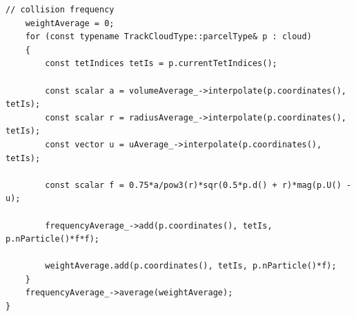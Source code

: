 \begin{lstlisting}[caption = average]
    // collision frequency
    weightAverage = 0;
    for (const typename TrackCloudType::parcelType& p : cloud)
    {
        const tetIndices tetIs = p.currentTetIndices();

        const scalar a = volumeAverage_->interpolate(p.coordinates(), tetIs);
        const scalar r = radiusAverage_->interpolate(p.coordinates(), tetIs);
        const vector u = uAverage_->interpolate(p.coordinates(), tetIs);

        const scalar f = 0.75*a/pow3(r)*sqr(0.5*p.d() + r)*mag(p.U() - u);

        frequencyAverage_->add(p.coordinates(), tetIs, p.nParticle()*f*f);

        weightAverage.add(p.coordinates(), tetIs, p.nParticle()*f);
    }
    frequencyAverage_->average(weightAverage);
}

\end{lstlisting}
\fi






